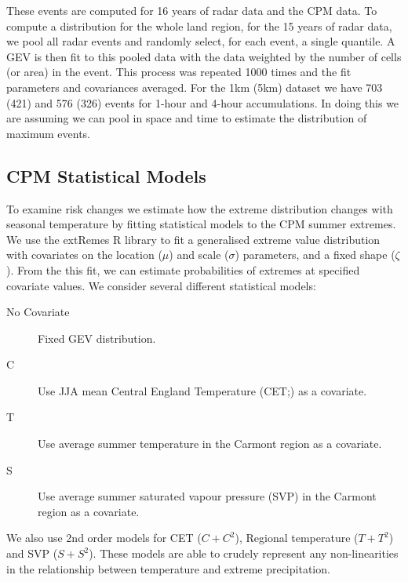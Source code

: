 \documentclass[11pt,a4paper]{article}
\begin{document}
These events are computed for  16 years of radar data and  the CPM data. 
To compute a distribution for the whole land region, for the 15 years of radar data, we pool all radar events and  randomly select, for each event, a single quantile. A GEV is then fit to this pooled data \parencite{gilleland2016extremes} with the data weighted by the number of cells (or area)  in the event. This process was repeated 1000 times and the fit parameters and covariances averaged. For the 1km (5km) dataset we have 703 (421) and 576 (326)  events for 1-hour and 4-hour accumulations.   In doing this we are assuming we can pool in space and time to estimate the distribution of maximum events. 

\subsection{CPM Statistical Models}


To examine risk changes we  estimate how the extreme distribution changes with seasonal temperature by fitting statistical models to the CPM summer extremes. We use the extRemes R library\parencite{gilleland2016extremes} to fit a generalised extreme value distribution\parencite{Coles_2001} with covariates on the location  ($\mu$) and scale  ($\sigma$) parameters, and a fixed shape ($\zeta$).  From the this fit, we can estimate probabilities of extremes at specified covariate values.  We consider several different statistical models:
\begin{description}
	\item[No Covariate] Fixed GEV distribution. 
	\item[C] Use JJA mean Central England Temperature (CET;\cite{parker92cet}) as a covariate.
	\item[T] Use average summer temperature in the Carmont region as a covariate.
	\item[S] Use average summer saturated vapour pressure (SVP) in the Carmont region as a covariate. 
\end{description}
We also use 2nd order  models for CET ($C+C^2$), Regional temperature ($T+T^2$) and SVP ($S+S^2$). These models are able to crudely represent any non-linearities in the relationship between temperature and extreme precipitation. 
\end{document}
